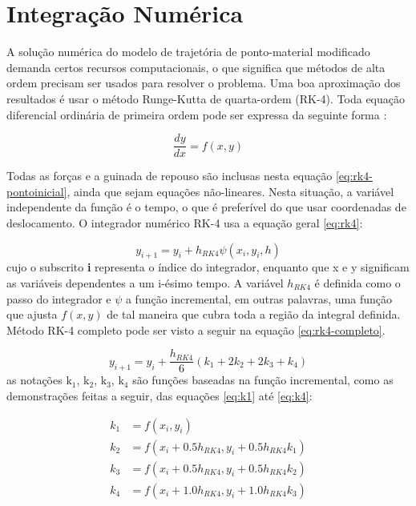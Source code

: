 \section{Integração Numérica}
\label{sec:numint}

A solução numérica do modelo de trajetória de ponto-material modificado demanda certos recursos computacionais, o que significa que métodos de alta ordem precisam ser usados para resolver o problema. Uma boa aproximação dos resultados é usar o método Runge-Kutta de quarta-ordem (RK-4). Toda equação diferencial ordinária de primeira ordem pode ser expressa da seguinte forma \cite{ruggiero1996calculo}:

\begin{equation}
    \label{eq:rk4-pontoinicial}
    \frac{dy}{dx} = f(x,y)
\end{equation}

Todas as forças e a guinada de repouso são inclusas nesta equação \ref{eq:rk4-pontoinicial}, ainda que sejam equações não-lineares. Nesta situação, a variável independente da função é o tempo, o que é preferível do que usar coordenadas de deslocamento. O integrador numérico RK-4 usa a equação geral \ref{eq:rk4}:

\begin{equation}
    \label{eq:rk4}
    y_{i+1} = y_{i} + h_{RK4}\psi(x_{i},y_{i},h)
\end{equation}
%
cujo o subscrito \textbf{i} representa o índice do integrador, enquanto que x e y significam as variáveis dependentes a um i-ésimo tempo. A variável \(h_{RK4}\) é definida como o passo do integrador e \(\psi\) a função incremental, em outras palavras, uma função que ajusta \(f(x,y)\) de tal maneira que cubra toda a região da integral definida. Método RK-4 completo pode ser visto a seguir na equação \ref{eq:rk4-completo}.

\begin{equation}
    \label{eq:rk4-completo}
    y_{i+1} = y_{i} + \frac{h_{RK4}}{6}(k_{1}+2k_{2}+2k_{3}+k_{4})
\end{equation}
%
as notações \(\text{k}_{1}\), \(\text{k}_{2}\), \(\text{k}_{3}\), \(\text{k}_{4}\) são funções baseadas na função incremental, como as demonstrações feitas a seguir, das equações \ref{eq:k1} até \ref{eq:k4}:

\begin{subequations}\label{eq:rk4-termos-k1-ate-k4}
\begin{align}
    \label{eq:k1}
    k_{1} &= f(x_{i},y_{i}) \\
    \label{eq:k2}
    k_{2} &= f(x_{i}+\num{0,5}h_{RK4},y_{i}+\num{0,5}h_{RK4}k_{1}) \\
    \label{eq:k3}
    k_{3} &= f(x_{i}+\num{0,5}h_{RK4},y_{i}+\num{0,5}h_{RK4}k_{2}) \\
    \label{eq:k4}
    k_{4} &= f(x_{i}+\num{1,0}h_{RK4},y_{i}+\num{1,0}h_{RK4}k_{3}) 
\end{align}
\end{subequations}

